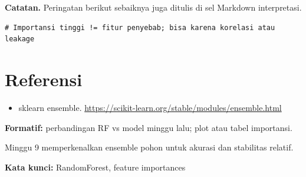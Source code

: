 \documentclass[../main.tex]{subfiles}
\begin{document}
\MulaiPenjelasanKode \textbf{Catatan.} Peringatan berikut sebaiknya juga ditulis di sel Markdown interpretasi. \SelesaiPenjelasanKode

\begin{lstlisting}[caption=Catatan interpretasi di Markdown]
# Importansi tinggi != fitur penyebab; bisa karena korelasi atau leakage
\end{lstlisting}

\section{Referensi}

\begin{itemize}[leftmargin=*]
  \item sklearn ensemble. \url{https://scikit-learn.org/stable/modules/ensemble.html}
\end{itemize}

\begin{asesmen}
\textbf{Formatif:} perbandingan RF vs model minggu lalu; plot atau tabel importansi.
\end{asesmen}

\begin{rangkuman}
Minggu 9 memperkenalkan ensemble pohon untuk akurasi dan stabilitas relatif.

\textbf{Kata kunci:} RandomForest, feature importances
\end{rangkuman}
\end{document}
